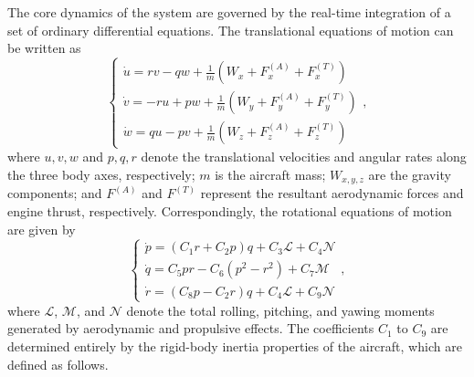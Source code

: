 \documentclass[pdflatex,sn-mathphys-num]{sn-jnl}%
\theoremstyle{thmstyleone}%
\theoremstyle{thmstyletwo}%
\theoremstyle{thmstylethree}%
\begin{document}
The core dynamics of the system are governed by the real-time integration of a set of ordinary differential equations. The translational equations of motion can be written as
\begin{equation}
    \begin{cases}
        \dot{u} = r v - q w + \frac{1}{m}\left(W_x + F_x^{(A)} + F_x^{(T)}\right) \\
        \dot{v} = -r u + p w + \frac{1}{m}\left(W_y + F_y^{(A)} + F_y^{(T)}\right) \\
        \dot{w} = q u - p v + \frac{1}{m}\left(W_z + F_z^{(A)} + F_z^{(T)}\right)
    \end{cases},
    \label{eq:clmes}
\end{equation}
where $u, v, w$ and $p, q, r$ denote the translational velocities and angular rates along the three body axes, respectively; $m$ is the aircraft mass; $W_{x,y,z}$ are the gravity components; and $F^{(A)}$ and $F^{(T)}$ represent the resultant aerodynamic forces and engine thrust, respectively. Correspondingly, the rotational equations of motion are given by
\begin{equation}
    \begin{cases}
        \dot{p} = (C_1 r + C_2 p)q + C_3 \mathcal{L} + C_4 \mathcal{N} \\
        \dot{q} = C_5 p r - C_6 (p^2 - r^2) + C_7 \mathcal{M} \\
        \dot{r} = (C_8 p - C_2 r)q + C_4 \mathcal{L} + C_9 \mathcal{N}
    \end{cases},
    \label{eq:cames}
\end{equation}
where $\mathcal{L}$, $\mathcal{M}$, and $\mathcal{N}$ denote the total rolling, pitching, and yawing moments generated by aerodynamic and propulsive effects. The coefficients $C_1$ to $C_9$ are determined entirely by the rigid-body inertia properties of the aircraft, which are defined as follows.
\end{document}
